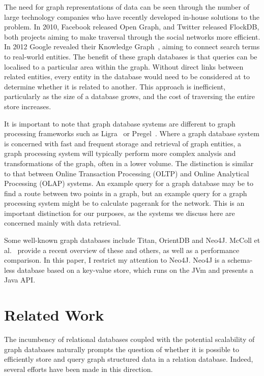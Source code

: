 The need for graph representations of data can be seen through the number of
large technology companies who have recently developed in-house solutions to
the problem. In 2010, Facebook released Open Graph, and Twitter released
FlockDB\cite{pointer2010introducing}, both projects aiming to make traversal
through the social networks more efficient. In 2012 Google revealed their
Knowledge Graph~\cite{singhal2012introducing}, aiming to connect search terms
to real-world entities. The benefit of these graph databases is that queries
can be localised to a particular area within the graph. Without direct links
between related entities, every entity in the database would need to be
considered at to determine whether it is related to another. This approach is
inefficient, particularly as the size of a database grows, and the cost of
traversing the  entire store increases.

It is important to note that graph database systems are different to graph
processing frameworks such as Ligra~\cite{shun2013ligra} or
Pregel~\cite{malewicz2010pregel}. Where a graph database system is concerned
with fast and frequent storage and retrieval of graph entities, a graph
processing system will typically perform more complex analysis and
transformations of the graph, often in a lower volume. The distinction is
similar to that between Online Transaction Processing (OLTP) and Online
Analytical Processing (OLAP) systems. An example query for a graph database
may be to find a route between two points in a graph, but an example query for
a graph processing system might be to calculate pagerank for the network. This
is an important distinction for our purposes, as the systems we discuss here
are concerned mainly with data retrieval. 

Some well-known graph databases include Titan, OrientDB and Neo4J. McColl et
al.~\cite{mccoll2014performance} provide a recent overview of these and
others, as well as a performance comparison. In this paper, I restrict my
attention to Neo4J. Neo4J is a schema-less database based on a key-value
store, which runs on the JVm and presents a Java API.

\section{Related Work}

The incumbency of relational databases coupled with the potential scalability
of  graph databases naturally prompts the question of whether it is possible
to efficiently store and query graph structured data in a relation database.
Indeed, several efforts have been made in this direction. 

